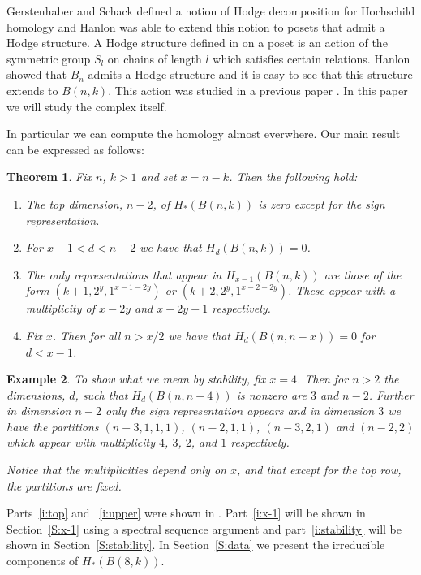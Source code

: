 \documentclass{amsart}
\newtheorem{theorem}{Theorem}[section]
\newtheorem{example}[theorem]{Example}
\begin{document}
Gerstenhaber and Schack \cite{GS} defined a notion of Hodge decomposition for Hochschild homology and Hanlon \cite{Hanlon}
was able to extend this notion to posets that admit a Hodge structure. A Hodge structure defined in \cite{Hanlon} on a 
poset is an action of the symmetric group
$S_l$ on chains of length $l$ which satisfies certain 
relations. Hanlon showed that $B_n$ admits a Hodge structure and it is easy to see that this structure extends to $B(n, k)$.
This action was studied in a previous paper \cite{S1}. 
In this paper we will study the complex itself.

In particular we can compute the homology almost everwhere. Our main result can be expressed as follows:
\begin{theorem} \label{T:main} Fix $n$, $k>1$ and set $x=n-k$. Then the following hold:
  \begin{enumerate}
    \item \label{i:top} The top dimension, $n-2$, of $H_*(B(n, k))$ is zero except for the sign representation.
    \item \label{i:upper} For $x-1 < d < n-2$ we have that $H_d(B(n, k))=0$.
    \item \label{i:x-1} The only representations that appear in $H_{x-1}(B(n, k))$ are those of the form 
          $(k+1, 2^y, 1^{x-1-2y})$ or
          $(k+2, 2^y, 1^{x-2-2y})$. These appear with a multiplicity of $x-2y$ and $x-2y-1$ respectively.
    \item \label{i:stability} Fix $x$. Then for all $n > x/2$ we have that $H_d(B(n, n-x)) = 0$ for $d < x - 1$.
  \end{enumerate}
\end{theorem}

\begin{example}
  To show what we mean by stability, fix $x=4$. Then for $n> 2$ the dimensions, $d$,  such that $H_d(B(n, n-4))$ is nonzero 
  are $3$ and $n-2$. Further
  in dimension $n-2$ only the sign representation appears and in dimension $3$ we have the partitions
  $(n-3, 1, 1, 1)$, $(n-2, 1, 1)$, $(n-3, 2, 1)$ and $(n-2, 2)$ which appear with multiplicity $4$, $3$, $2$, and $1$
  respectively.
  
  Notice that the multiplicities depend only on $x$, and that except for the top row, the partitions are fixed.
\end{example}

Parts~\ref{i:top} and ~\ref{i:upper} were shown in \cite{S1}. Part~\ref{i:x-1} will be shown in Section~\ref{S:x-1} using 
a spectral sequence argument and part~\ref{i:stability} will be shown in Section~\ref{S:stability}. In Section~\ref{S:data}
we present the irreducible components of $H_*(B(8, k))$. 
\end{document}
